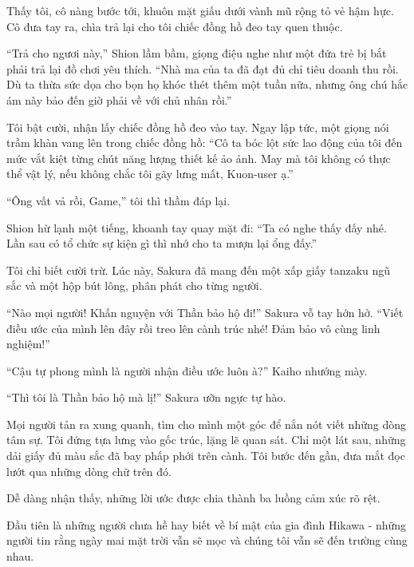 \documentclass[../main.tex]{subfiles}
\begin{document}
Thấy tôi, cô nàng bước tới, khuôn mặt giấu dưới vành mũ rộng tỏ vẻ hậm hực. Cô đưa tay ra, chìa trả lại cho tôi chiếc đồng hồ đeo tay quen thuộc.

``Trả cho ngươi này,'' Shion lầm bầm, giọng điệu nghe như một đứa trẻ bị bắt phải trả lại đồ chơi yêu thích. ``Nhà ma của ta đã đạt đủ chỉ tiêu doanh thu rồi. Dù ta thừa sức dọa cho bọn họ khóc thét thêm một tuần nữa, nhưng ông chú hắc ám này bảo đến giờ phải về với chủ nhân rồi.''

Tôi bật cười, nhận lấy chiếc đồng hồ đeo vào tay. Ngay lập tức, một giọng nói trầm khàn vang lên trong chiếc đồng hồ: ``Cô ta bóc lột sức lao động của tôi đến mức vắt kiệt từng chút năng lượng thiết kế ảo ảnh. May mà tôi không có thực thể vật lý, nếu không chắc tôi gãy lưng mất, Kuon-user ạ.''

``Ông vất vả rồi, Game,'' tôi thì thầm đáp lại.

Shion hừ lạnh một tiếng, khoanh tay quay mặt đi: ``Ta có nghe thấy đấy nhé. Lần sau có tổ chức sự kiện gì thì nhớ cho ta mượn lại ổng đấy.''

Tôi chỉ biết cười trừ. Lúc này, Sakura đã mang đến một xấp giấy tanzaku ngũ sắc và một hộp bút lông, phân phát cho từng người.

``Nào mọi người! Khấn nguyện với Thần bảo hộ đi!'' Sakura vỗ tay hớn hở. ``Viết điều ước của mình lên đây rồi treo lên cành trúc nhé! Đảm bảo vô cùng linh nghiệm!''

``Cậu tự phong mình là người nhận điều ước luôn à?'' Kaiho nhướng mày.

``Thì tôi là Thần bảo hộ mà lị!'' Sakura ưỡn ngực tự hào.

Mọi người tản ra xung quanh, tìm cho mình một góc để nắn nót viết những dòng tâm sự. Tôi đứng tựa lưng vào gốc trúc, lặng lẽ quan sát. Chỉ một lát sau, những dải giấy đủ màu sắc đã bay phấp phới trên cành. Tôi bước đến gần, đưa mắt đọc lướt qua những dòng chữ trên đó.

Dễ dàng nhận thấy, những lời ước được chia thành ba luồng cảm xúc rõ rệt.

Đầu tiên là những người chưa hề hay biết về bí mật của gia đình Hikawa - những người tin rằng ngày mai mặt trời vẫn sẽ mọc và chúng tôi vẫn sẽ đến trường cùng nhau.


\end{document}
